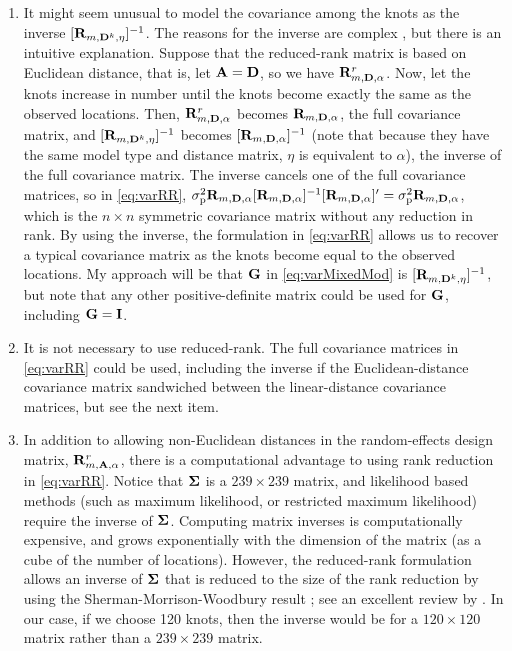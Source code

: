 \documentclass[11pt, titlepage]{article}\usepackage[]{graphicx}\usepackage[]{color}
\begin{document}
\begin{spacing}{1.9}
\begin{flushleft}
\begin{enumerate}
		\item It might seem unusual to model the covariance among the knots as the inverse $[\mathbf{R}_{m,\mathbf{D}^k,\eta}]^{-1}$. The reasons for the inverse are complex \citep{Bane:Gelf:Finl:Sang:gaus:2008},  but there is an intuitive explanation.  Suppose that the reduced-rank matrix is based on Euclidean distance, that is, let $\mathbf{A} = \mathbf{D}$, so we have $\mathbf{R}^r_{m,\mathbf{D},\alpha}$. Now, let the knots increase in number until the knots become exactly the same as the observed locations. Then, $\mathbf{R}^r_{m,\mathbf{D},\alpha}$ becomes $\mathbf{R}_{m,\mathbf{D},\alpha}$, the full covariance matrix, and $[\mathbf{R}_{m,\mathbf{D}^k,\eta}]^{-1}$ becomes $[\mathbf{R}_{m,\mathbf{D},\alpha}]^{-1}$ (note that because they have the same model type and distance matrix, $\eta$ is equivalent to $\alpha$), the inverse of the full covariance matrix. The inverse cancels one of the full covariance matrices, so in \ref{eq:varRR}, $\sigma^2_\textrm{p}\mathbf{R}_{m,\mathbf{D},\alpha}[\mathbf{R}_{m,\mathbf{D},\alpha}]^{-1}[\mathbf{R}_{m,\mathbf{D},\alpha}]^{\prime} = \sigma^2_\textrm{p}\mathbf{R}_{m,\mathbf{D},\alpha}$, which is the $n \times n$ symmetric covariance matrix without any reduction in rank.  By using the inverse, the formulation in \ref{eq:varRR} allows us to recover a typical covariance matrix as the knots become equal to the observed locations.  My approach will be that $\mathbf{G}$ in \ref{eq:varMixedMod} is $[\mathbf{R}_{m,\mathbf{D}^k,\eta}]^{-1}$, but note that any other positive-definite matrix could be used for $\mathbf{G}$, including $\mathbf{G} = \mathbf{I}$.
		\item It is not necessary to use reduced-rank.  The full covariance matrices in \ref{eq:varRR} could be used, including the inverse if the Euclidean-distance covariance matrix sandwiched between the linear-distance covariance matrices, but see the next item.
		\item In addition to allowing non-Euclidean distances in the random-effects design matrix, $\mathbf{R}^r_{m,\mathbf{A},\alpha}$, there is a computational advantage to using rank reduction in \ref{eq:varRR}.  Notice that $\mbox{\boldmath $\Sigma$}$ is a $239 \times 239$ matrix, and likelihood based methods (such as maximum likelihood, or restricted maximum likelihood) require the inverse of $\mbox{\boldmath $\Sigma$}$.  Computing matrix inverses is computationally expensive, and grows exponentially with the dimension of the matrix (as a cube of the number of locations).  However, the reduced-rank formulation allows an inverse of $\mbox{\boldmath $\Sigma$}$ that is reduced to the size of the rank reduction by using the Sherman-Morrison-Woodbury result \citep{Sher:Morr:adju:1949,Wood:inve:1950}; see an excellent review by \citet{Hend:Sear:on:1981}. In our case, if we choose 120 knots, then the inverse would be for a $120 \times 120$ matrix rather than a $239 \times 239$ matrix.
		

\end{enumerate}
\end{flushleft}
\end{spacing}
\end{document}
